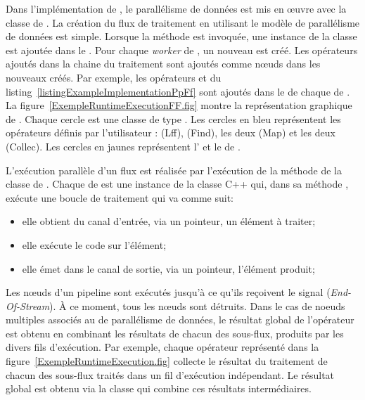 Dans l'impl\'ementation de , le parall\'elisme de donn\'ees est mis en œuvre avec la classe  de . La cr\'eation du flux de traitement en utilisant le mod\`ele de parall\'elisme de donn\'ees est simple. Lorsque la m\'ethode  est invoqu\'ee, une instance de la classe  est ajout\'ee dans le . Pour chaque \emph{worker} de , un nouveau  est cr\'e\'e. Les op\'erateurs ajout\'es dans la chaine du traitement  sont ajout\'es comme nœuds dans les nouveaux  cr\'e\'es. Par exemple, les op\'erateurs  et  du listing~\ref{listingExampleImplementationPpFf} sont ajout\'es dans le  de chaque  de . La figure~\ref{ExempleRuntimeExecutionFF.fig} montre la repr\'esentation graphique de . Chaque cercle est une classe de type . Les cercles en bleu repr\'esentent les op\'erateurs d\'efinis par l'utilisateur :  (Lff),  (Find), les deux  (Map) et les deux  (Collec). Les cercles en jaunes repr\'esentent l' et le  de . 




L'ex\'ecution parall\`ele d'un flux est r\'ealis\'ee par l'ex\'ecution de la m\'ethode  de la classe  de . Chaque  de  est une instance de la classe C++  qui, dans sa m\'ethode ,  ex\'ecute une boucle de traitement qui va comme suit:
\begin{itemize}
	\item elle obtient du canal d'entr\'ee, via un pointeur, un \'el\'ement \`a traiter;
	\item elle ex\'ecute le code sur l'\'el\'ement;
	\item elle \'emet dans le canal de sortie,  via un pointeur,  l'\'el\'ement produit;
\end{itemize}

Les nœuds d'un pipeline sont ex\'ecut\'es jusqu'\`a ce qu'ils re\c coivent le signal  (\emph{End-Of-Stream}). \`A ce moment, tous les nœuds sont d\'etruits. Dans le cas de noeuds multiples associ\'es au de parall\'elisme de donn\'ees, le r\'esultat global de l'op\'erateur est obtenu en combinant les r\'esultats de chacun des sous-flux, produits par les divers fils d'ex\'ecution. Par exemple, chaque op\'erateur  repr\'esent\'e dans la figure~\ref{ExempleRuntimeExecution.fig} collecte le r\'esultat du traitement de chacun des sous-flux trait\'es dans un fil d'ex\'ecution ind\'ependant. Le r\'esultat global est obtenu via la classe  qui combine ces r\'esultats interm\'ediaires.
